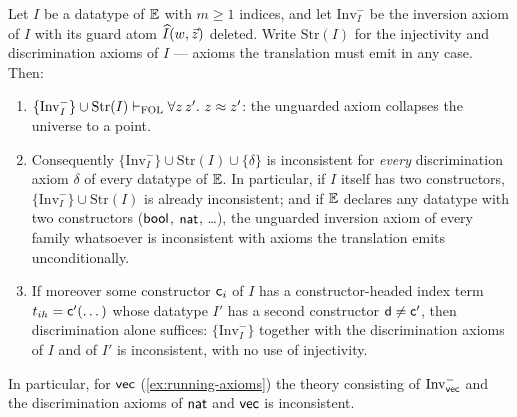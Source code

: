 \begin{proposition}
\label{prop:unguarded-inconsistent}
Let $I$ be a datatype of $\mathbb{E}$ with $m \geq 1$ indices, and let
$\mathrm{Inv}^-_I$ be the inversion axiom of $I$ with its guard atom
$\widehat{I}(w, \vec{z})$ deleted.  Write $\mathrm{Str}(I)$ for the
injectivity and discrimination axioms of $I$ --- axioms the
translation must emit in any case.  Then:
\begin{enumerate}[leftmargin=2em]
\item $\{\mathrm{Inv}^-_I\} \cup \mathrm{Str}(I) \vdash_{\mathrm{FOL}} \forall
  z\,z'.\ z \approx z'$: the unguarded axiom collapses the universe to a
  point.
\item Consequently $\{\mathrm{Inv}^-_I\} \cup \mathrm{Str}(I) \cup
  \{\delta\}$ is inconsistent for \emph{every} discrimination axiom
  $\delta$ of every datatype of $\mathbb{E}$.  In particular, if $I$ itself
  has two constructors, $\{\mathrm{Inv}^-_I\} \cup \mathrm{Str}(I)$ is
  already inconsistent; and if $\mathbb{E}$ declares any datatype with two
  constructors ($\mathsf{bool}$, $\mathsf{nat}$, \dots), the unguarded inversion axiom
  of every family whatsoever is inconsistent with axioms the
  translation emits unconditionally.
\item If moreover some constructor $\mathsf{c}_i$ of $I$ has a
  constructor-headed index term $t_{ih} = \mathsf{c}'(\dots)$ whose
  datatype $I'$ has a second constructor $\mathsf{d} \neq \mathsf{c}'$,
  then discrimination alone suffices: $\{\mathrm{Inv}^-_I\}$ together
  with the discrimination axioms of $I$ and of $I'$ is inconsistent,
  with no use of injectivity.
\end{enumerate}
In particular, for $\mathsf{vec}$ (\cref{ex:running-axioms}) the theory
consisting of $\mathrm{Inv}^-_{\mathsf{vec}}$ and the discrimination axioms
of $\mathsf{nat}$ and $\mathsf{vec}$ is inconsistent.
\end{proposition}

